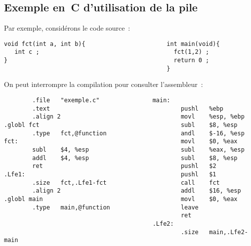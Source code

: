 \begin{frame}
  \section{Exemple en~C d'utilisation de la pile}%
  Par exemple, consid\'erons le code source~:
\begin{verbatim}
void fct(int a, int b){                       int main(void){
   int c ;                                      fct(1,2) ;   
}                                               return 0 ;   
                                              }              
\end{verbatim}
  On peut  interrompre    la  compilation   pour consulter   l'assembleur~:
\begin{verbatim}
        .file   "exemple.c"               main:                                                          
        .text                                     pushl   %ebp                                          
        .align 2                                  movl    %esp, %ebp                                    
.globl fct                                        subl    $8, %esp                                      
        .type   fct,@function                     andl    $-16, %esp                                    
fct:                                              movl    $0, %eax                                      
        subl    $4, %esp                          subl    %eax, %esp                                    
        addl    $4, %esp                          subl    $8, %esp                                      
        ret                                       pushl   $2                                            
.Lfe1:                                            pushl   $1                                            
        .size   fct,.Lfe1-fct                     call    fct                                           
        .align 2                                  addl    $16, %esp                                     
.globl main                                       movl    $0, %eax                                      
        .type   main,@function                    leave                                                 
                                                  ret                                                   
                                          .Lfe2:                                                        
                                                  .size   main,.Lfe2-main                               

\end{verbatim}
\end{frame}

